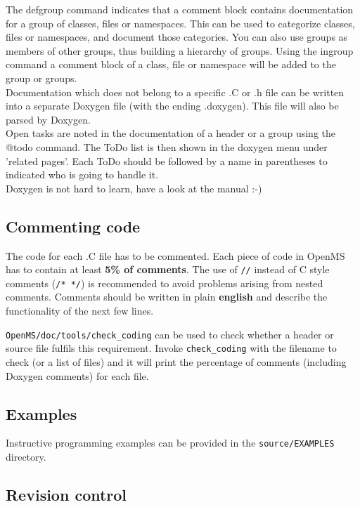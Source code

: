 \documentclass[a4]{article}
\begin{document}
The defgroup command indicates that a comment block contains documentation for a group of classes, files or namespaces.
This can be used to categorize classes, files or namespaces, and document those categories. 
You can also use groups as members of other groups, thus building a hierarchy of groups. 
Using the ingroup command a comment block of a class, file or namespace will be added to the group or groups.\\
Documentation which does not belong to a specific .C or .h file can be written into a 
separate Doxygen file (with the ending .doxygen). This file will also be parsed by Doxygen.\\
Open tasks are noted in the documentation of a header or a group using the @todo command.
The ToDo list is then shown in the doxygen menu under 'related pages'. Each ToDo should be
followed by a name in parentheses to indicated who is going to handle it.\\
Doxygen is not hard to learn, have a look at the manual :-)


\subsection{Commenting code}

The code for each .C file has to be commented. Each piece of code in OpenMS
has to contain at least {\bf 5\% of comments}. The use of {\tt //} instead of
C style comments ({\tt /* */}) is recommended to avoid problems arising from
nested comments. Comments should be written in plain \textbf{english} and
describe the functionality of the next few lines.

{\tt OpenMS/doc/tools/check\_coding} can be used to check whether a header or 
source file fulfils this requirement. Invoke {\tt check\_coding} with the
filename to check (or a list of files) and it will print the percentage of
comments (including Doxygen comments) for each file.


\subsection{Examples}

Instructive programming examples can be provided in the
\texttt{source/EXAMPLES} directory.


\subsection{Revision control}
\end{document}
